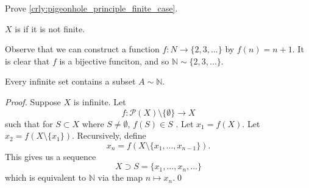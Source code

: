 \documentclass[notoc,notitlepage]{tufte-book}
\begin{document}
\begin{ex}
  Prove \cref{crly:pigeonhole_principle_finite_case}.
\end{ex}

\begin{defn}
\label{defn:infinite_sets}
$X$ is  if it is not finite.
\end{defn}

\begin{eg}
  Observe that we can construct a function $f : N \to \{ 2, 3, ... \}$ by $f(n) = n + 1$. It is clear that $f$ is a bijective funciton, and so $\mathbb{N} \sim \{2, 3, ... \}$.
\end{eg}

\begin{propo}
\label{propo:_n_is_the_smallest_infinite_set}
  Every infinite set contains a subset $A \sim \mathbb{N}$.
\end{propo}

\begin{proof}
  Suppose $X$ is infinite. Let
  \begin{equation*}
    f : \mathcal{P}(X) \setminus \{ \emptyset \} \to X
  \end{equation*}
  such that for $S \subset X$ where $S \neq \emptyset$, $f(S) \in S$ . Let $x_1 = f(X)$. Let $x_2 = f(X \setminus \{ x_1 \})$. Recursively, define
  \begin{equation*}
    x_n = f(X \setminus \{x_1, ..., x_{n - 1}\}).
  \end{equation*}
  This gives us a sequence
  \begin{equation*}
    X \supset S = \{x_1, ..., x_n, ... \}
  \end{equation*}
  which is equivalent to $\mathbb{N}$ via the map $n \mapsto x_n$.\qed
\end{proof}
\end{document}
